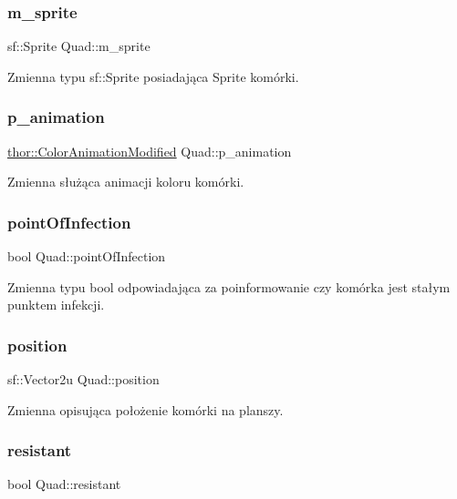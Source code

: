 \subsubsection{\texorpdfstring{m\+\_\+sprite}{m\_sprite}}
{\footnotesize\ttfamily sf\+::\+Sprite Quad\+::m\+\_\+sprite\hspace{0.3cm}{\ttfamily [private]}}

Zmienna typu sf\+::\+Sprite posiadająca Sprite komórki. \mbox{\label{class_quad_ace5b5f07a650f624aeb07806bc34d3f6}} 
\subsubsection{\texorpdfstring{p\+\_\+animation}{p\_animation}}
{\footnotesize\ttfamily \mbox{\hyperlink{classthor_1_1_color_animation_modified}{thor\+::\+Color\+Animation\+Modified}} Quad\+::p\+\_\+animation}

Zmienna służąca animacji koloru komórki. \mbox{\label{class_quad_a033c364211aab4e91aeb1609d4d890fe}} 
\subsubsection{\texorpdfstring{point\+Of\+Infection}{pointOfInfection}}
{\footnotesize\ttfamily bool Quad\+::point\+Of\+Infection}

Zmienna typu bool odpowiadająca za poinformowanie czy komórka jest stałym punktem infekcji. \mbox{\label{class_quad_af0820dc173ffac240bcfe0a19dc2fe8a}} 
\subsubsection{\texorpdfstring{position}{position}}
{\footnotesize\ttfamily sf\+::\+Vector2u Quad\+::position}

Zmienna opisująca położenie komórki na planszy. \mbox{\label{class_quad_ae2197ad46a2d7e409b2ca9e7ac25a80c}} 
\subsubsection{\texorpdfstring{resistant}{resistant}}
{\footnotesize\ttfamily bool Quad\+::resistant}

